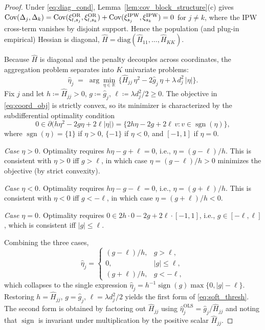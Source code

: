 \documentclass{article}
\begin{document}
\begin{proof}
Under \eqref{eq:diag_cond}, Lemma~\ref{lem:cov_block_structure}(c) gives $\operatorname{Cov}(\Delta_j,\Delta_k)=\operatorname{Cov}(\xi^{\mathrm{OR}}_{t,s_j},\xi^{\mathrm{OR}}_{t,s_k})+\operatorname{Cov}(\xi^{\mathrm{IPW}}_{s_j},\xi^{\mathrm{IPW}}_{s_k})=0$ for $j\neq k$, where the IPW cross-term vanishes by disjoint support. Hence the population (and plug-in empirical) Hessian is diagonal, $\widehat{H}=\mathrm{diag}(\widehat{H}_{11},\ldots,\widehat{H}_{KK})$.

Because $\widehat{H}$ is diagonal and the penalty decouples across coordinates, the aggregation problem separates into $K$ univariate problems:
\begin{equation}\label{eq:coord_obj}
\widehat{\eta}_j\;=\;\arg\min_{\eta\in\mathbb{R}}\,\bigl\{\widehat{H}_{jj}\,\eta^2-2\widehat{g}_j\,\eta+\lambda\,d_j^2\,|\eta|\bigr\}.
\end{equation}
Fix $j$ and let $h\coloneqq\widehat{H}_{jj}>0$, $g\coloneqq\widehat{g}_j$, $\ell\coloneqq\lambda d_j^2/2\ge 0$. The objective in \eqref{eq:coord_obj} is strictly convex, so its minimizer is characterized by the subdifferential optimality condition
\[
0\in\partial\bigl(h\eta^2-2g\eta+2\ell|\eta|\bigr)
=\{2h\eta-2g+2\ell\,v:v\in\operatorname{sgn}(\eta)\},
\]
where $\operatorname{sgn}(\eta)=\{1\}$ if $\eta>0$, $\{-1\}$ if $\eta<0$, and $[-1,1]$ if $\eta=0$.

\emph{Case $\eta>0$.} Optimality requires $h\eta-g+\ell=0$, i.e., $\eta=(g-\ell)/h$. This is consistent with $\eta>0$ iff $g>\ell$, in which case $\eta=(g-\ell)/h>0$ minimizes the objective (by strict convexity).

\emph{Case $\eta<0$.} Optimality requires $h\eta-g-\ell=0$, i.e., $\eta=(g+\ell)/h$. This is consistent with $\eta<0$ iff $g<-\ell$, in which case $\eta=(g+\ell)/h<0$.

\emph{Case $\eta=0$.} Optimality requires $0\in 2h\cdot 0-2g+2\ell\cdot[-1,1]$, i.e., $g\in[-\ell,\ell]$, which is consistent iff $|g|\le\ell$.

Combining the three cases,
\[
\widehat{\eta}_j=\begin{cases}
(g-\ell)/h,&g>\ell,\\
0,&|g|\le\ell,\\
(g+\ell)/h,&g<-\ell,
\end{cases}
\]
which collapses to the single expression $\widehat{\eta}_j=h^{-1}\operatorname{sign}(g)\max\{0,|g|-\ell\}$. Restoring $h=\widehat{H}_{jj}$, $g=\widehat{g}_j$, $\ell=\lambda d_j^2/2$ yields the first form of \eqref{eq:soft_thresh}. The second form is obtained by factoring out $\widehat{H}_{jj}$ using $\widehat{\eta}_j^{\mathrm{OLS}}=\widehat{g}_j/\widehat{H}_{jj}$ and noting that $\operatorname{sign}$ is invariant under multiplication by the positive scalar $\widehat{H}_{jj}$.


\end{proof}
\end{document}
